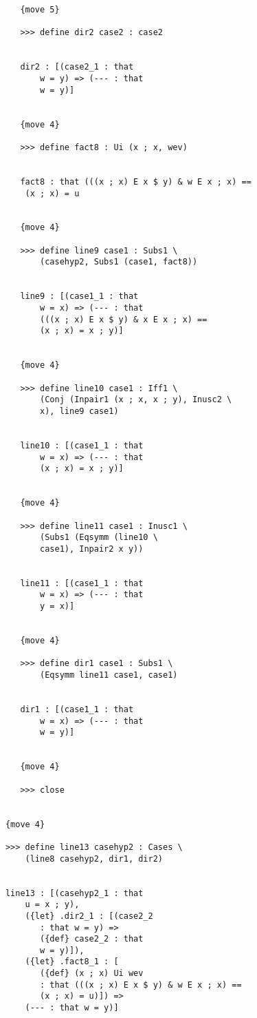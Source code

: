 \documentclass[12pt]{article}
\begin{document}
\begin{verbatim}
               {move 5}

               >>> define dir2 case2 : case2


               dir2 : [(case2_1 : that 
                   w = y) => (--- : that 
                   w = y)]


               {move 4}

               >>> define fact8 : Ui (x ; x, wev)


               fact8 : that (((x ; x) E x $ y) & w E x ; x) == 
                (x ; x) = u


               {move 4}

               >>> define line9 case1 : Subs1 \
                   (casehyp2, Subs1 (case1, fact8))


               line9 : [(case1_1 : that 
                   w = x) => (--- : that 
                   (((x ; x) E x $ y) & x E x ; x) == 
                   (x ; x) = x ; y)]


               {move 4}

               >>> define line10 case1 : Iff1 \
                   (Conj (Inpair1 (x ; x, x ; y), Inusc2 \
                   x), line9 case1)


               line10 : [(case1_1 : that 
                   w = x) => (--- : that 
                   (x ; x) = x ; y)]


               {move 4}

               >>> define line11 case1 : Inusc1 \
                   (Subs1 (Eqsymm (line10 \
                   case1), Inpair2 x y))


               line11 : [(case1_1 : that 
                   w = x) => (--- : that 
                   y = x)]


               {move 4}

               >>> define dir1 case1 : Subs1 \
                   (Eqsymm line11 case1, case1)


               dir1 : [(case1_1 : that 
                   w = x) => (--- : that 
                   w = y)]


               {move 4}

               >>> close


            {move 4}

            >>> define line13 casehyp2 : Cases \
                (line8 casehyp2, dir1, dir2)


            line13 : [(casehyp2_1 : that 
                u = x ; y), 
                ({let} .dir2_1 : [(case2_2 
                   : that w = y) => 
                   ({def} case2_2 : that 
                   w = y)]), 
                ({let} .fact8_1 : [
                   ({def} (x ; x) Ui wev 
                   : that (((x ; x) E x $ y) & w E x ; x) == 
                   (x ; x) = u)]) => 
                (--- : that w = y)]



\end{verbatim}
\end{document}
